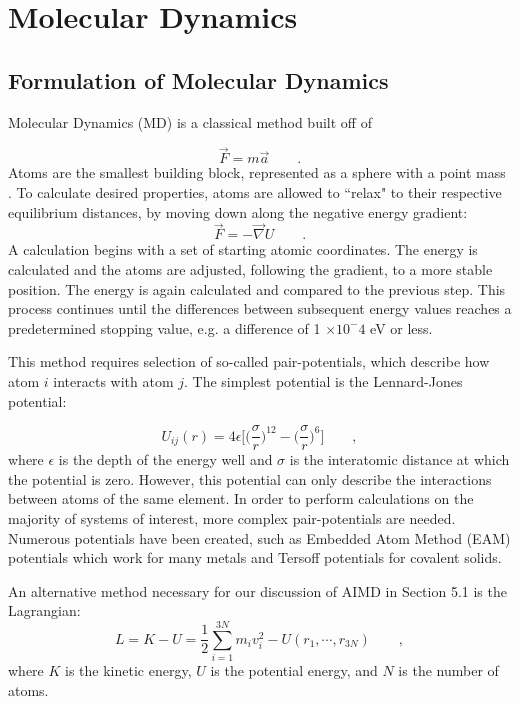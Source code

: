 \documentclass[3p,review,12pt]{elsarticle}
\begin{document}
\section{Molecular Dynamics}
\subsection{Formulation of Molecular Dynamics}
Molecular Dynamics (MD) is a classical method built off of

\begin{equation}
\vec{F}=m\vec{a} \qquad .
\end{equation}
Atoms are the smallest building block, represented as a sphere with a point mass \cite{Lee2012}. To calculate desired properties, atoms are allowed to ``relax" to their respective equilibrium distances, by moving down along the negative energy gradient:
\begin{equation}
\vec{F} = - \vec{\nabla} U \qquad .
\end{equation}
A calculation begins with a set of starting atomic coordinates. The energy is calculated and the atoms are adjusted, following the gradient, to a more stable position. The energy is again calculated and compared to the previous step. This process continues until the differences between subsequent energy values reaches a predetermined stopping value, e.g. a difference of 1 $\times 10^-4$ eV or less.
\par
This method requires selection of so-called pair-potentials, which describe how atom $i$ interacts with atom $j$. The simplest potential is the Lennard-Jones potential:

\begin{equation}
U_{ij}(r) = 4\epsilon \Bigg[\bigg(\frac{\sigma}{r}\bigg)^{12}-\bigg(\frac{\sigma}{r}\bigg)^{6}\Bigg] \qquad ,
\end{equation}
where $\epsilon$ is the depth of the energy well and $\sigma$ is the interatomic distance at which the potential is zero. However, this potential can only describe the interactions between atoms of the same element. In order to perform calculations on the majority of systems of interest, more complex pair-potentials are needed. Numerous potentials have been created, such as Embedded Atom Method (EAM) potentials which work for many metals and Tersoff potentials for covalent solids. 
\par 
An alternative method necessary for our discussion of AIMD in Section 5.1 is the Lagrangian:
\begin{equation}
L = K-U = \frac{1}{2}\sum_{i=1}^{3N}m_{i}v^{2}_{i}-U(r_{1}, \cdots, r_{3N})\qquad ,
\end{equation}
where $K$ is the kinetic energy, $U$ is the potential energy, and $N$ is the number of atoms.
\end{document}
